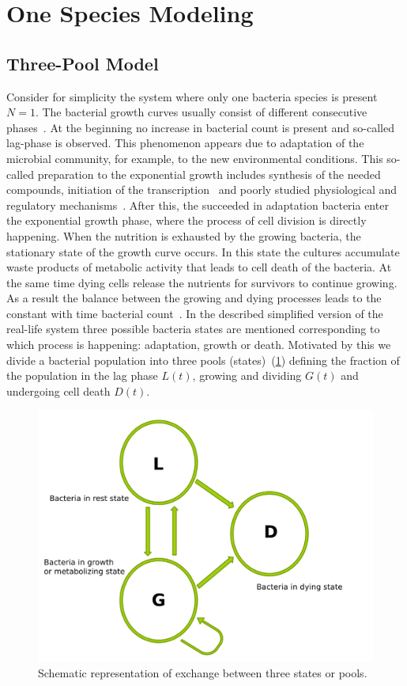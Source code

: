\documentclass[10pt,A4paper]{article}
\numberwithin{equation}{section}
\begin{document}
\section{One Species Modeling}
\subsection{Three-Pool Model}
Consider for simplicity the system where only one bacteria species is present $N=1$.
The bacterial growth curves usually consist of different consecutive phases~\cite{buchanan_when_1997}.
At the beginning no increase in bacterial count is present and so-called lag-phase is observed.
This phenomenon appears due to adaptation of the microbial community, for example, to the new environmental conditions.
This so-called preparation to the exponential growth includes synthesis of the needed compounds, initiation of the transcription~\cite{rolfe_lag_2012} and poorly studied physiological and regulatory mechanisms~\cite{monod_growth_1949}.
After this, the succeeded in adaptation bacteria enter the exponential growth phase, where the process of cell division is directly happening.
When the nutrition is exhausted by the growing bacteria, the stationary state of the growth curve occurs.
In this state the cultures accumulate waste products of metabolic activity that leads to cell death of the bacteria.
At the same time dying cells release the nutrients for survivors to continue growing.
As a result the balance between the growing and dying processes leads to the constant with time bacterial count~\cite{navarro_llorens_stationary_2010}.
In the described simplified version of the real-life system three possible bacteria states are mentioned corresponding to which process is happening: adaptation, growth or death.
Motivated by this we divide a bacterial population into three pools (states)~(\ref{fig:SchematicRep}) defining the fraction of the population in the lag phase $L(t)$, growing and dividing $G(t)$ and undergoing cell death $D(t)$.
\begin{figure}[t]
    \begin{center}
    \includegraphics[width=0.9\columnwidth]{Figures/TPM_fig.pdf}
    \caption{Schematic representation of exchange between three states or pools.}
    \label{fig:SchematicRep}
    \end{center}
\end{figure}
\end{document}
